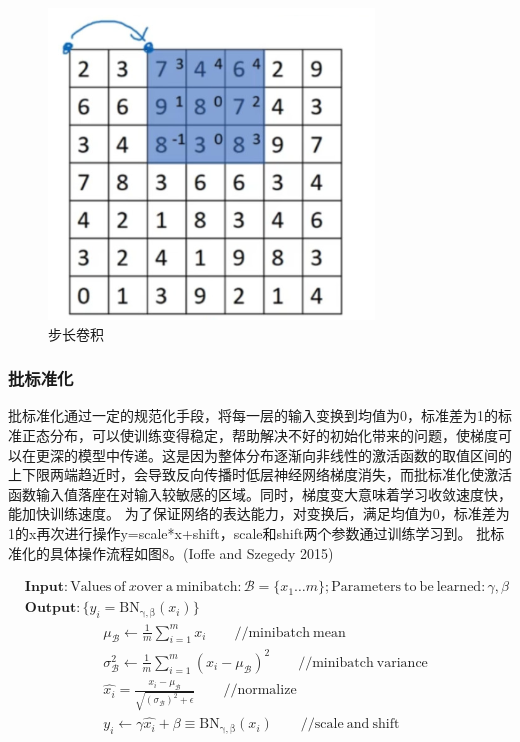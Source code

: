 \documentclass[hyperref, a4paper]{ctexart}
\begin{document}
\begin{figure}
\centering
\includegraphics{./7.png}
\caption{步长卷积}
\end{figure}

\hypertarget{ux6279ux6807ux51c6ux5316}{%
\subsubsection{批标准化}\label{ux6279ux6807ux51c6ux5316}}

批标准化通过一定的规范化手段，将每一层的输入变换到均值为0，标准差为1的标准正态分布，可以使训练变得稳定，帮助解决不好的初始化带来的问题，使梯度可以在更深的模型中传递。这是因为整体分布逐渐向非线性的激活函数的取值区间的上下限两端趋近时，会导致反向传播时低层神经网络梯度消失，而批标准化使激活函数输入值落座在对输入较敏感的区域。同时，梯度变大意味着学习收敛速度快，能加快训练速度。
为了保证网络的表达能力，对变换后，满足均值为0，标准差为1的x再次进行操作y=scale*x+shift，scale和shift两个参数通过训练学习到。
批标准化的具体操作流程如图8。(Ioffe and Szegedy 2015)

\[\begin{aligned}&\mathbf{Input}:\mathrm{Values\ of\ } x \mathrm{over\ a\ minibatch:}\mathcal{B}=\{x_1…m\};\mathrm{Parameters\ to\ be\ learned:}\gamma,\beta \\&\mathbf{Output:}\{y_i=\mathrm{BN_{\gamma,\beta}}(x_i)\}\end{aligned}\]
\[\begin{aligned}
&\mu_\mathcal{B}\gets\frac{1}{m}\sum_{i = 1}^{m}x_i \qquad\mathrm{//minibatch\ mean} \\
&\sigma^2_\mathcal{B}\gets\frac{1}{m}\sum_{i = 1}^{m}(x_i-\mu_\mathcal{B})^2\qquad \mathrm{//minibatch\ variance} \\
&\hat{x_i} = \frac{x_i -\mu_\mathcal{B} }{\sqrt{(\sigma_\mathcal{B})^2 + \epsilon}} \qquad\mathrm{//normalize}\\
&y_i\gets\gamma\hat{x_i} + \beta\equiv\mathrm{BN_{\gamma,\beta}}(x_i)\qquad \mathrm{//scale\ and\ shift}
\end{aligned}
\]
\end{document}
